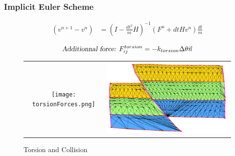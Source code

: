 \documentclass{beamer}
\begin{document}
	\begin{frame}
	\frametitle{Implicit Euler Scheme}
	
	\begin{align}
	(v^{n+1} - v^n) &= (I - \frac{dt^2}{m}H)^{-1}(F^n + dt H v^n)\frac{dt}{m}
	\end{align}
	
	\begin{equation}
\textsl{Additionnal force: } F_{ij}^{torsion} = -k_{torsion}\Delta \theta \vec{n}
	\end{equation}
	
	\begin{figure}[H]
	\centering
	\begin{tabular}{@{}cc@{}}
	\texttt{[image: torsionForces.png]}&
	\includegraphics[width=.45\textwidth]{collisions.png}\\
	\end{tabular}
	\caption{Torsion and Collision}
	\end{figure}

	\end{frame}
	
\end{document}
